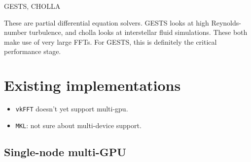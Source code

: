 \documentclass[12pt]{article}
\renewcommand{\(}{\left(}
\renewcommand{\)}{\right)}
\begin{document}
GESTS, CHOLLA

These are partial differential equation solvers.  GESTS looks at high
Reynolds-number turbulence, and cholla looks at interstellar fluid
simulations.  These both make use of very large FFTs.  For GESTS, this
is definitely the critical performance stage.

\section{Existing implementations}

\begin{itemize}
  \item \texttt{vkFFT} doesn't yet support multi-gpu.
  \item \texttt{MKL}: not sure about multi-device support.
\end{itemize}
    
\subsection{Single-node multi-GPU}
\end{document}
